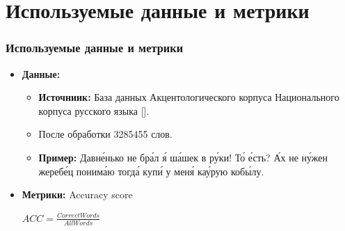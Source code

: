 \documentclass[russian]{beamer}
\begin{document}
\section{Используемые данные и метрики}
\begin{frame}
\frametitle{Используемые данные и метрики} 
\begin{itemize}
	\item \textbf{Данные:} 
	\begin{itemize}
		\item \textbf{Источниик:} База данных Акцентологического корпуса Национального корпуса русского языка [].  
		\item После обработки 3285455 слов.
		\item \textbf{Пример:} Давн\'{е}нько не бр\'{а}л \'{я} ш\'{а}шек в р\'{у}ки! Т\'{о} \'{е}сть? \'{А}х не н\'{у}жен жереб\'{е}ц поним\'{а}ю тогд\'{а} куп\'{и} у мен\'{я} ка\'{у}рую коб\'{ы}лу.
	\end{itemize} 
	\item \textbf{Метрики:} Accuracy score 
	\begin{center}
		$ACC =  \frac{CorrectWords}{AllWords}$
	\end{center}
	
\end{itemize}

\end{frame}
\end{document}

